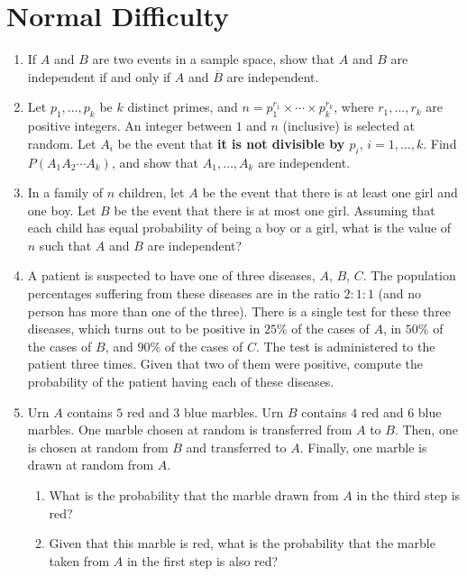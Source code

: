 \documentclass[svgnames]{amsart}
\begin{document}
\section{Normal Difficulty}
\begin{enumerate}[leftmargin=*]
\item If $A$ and $B$ are two events in a sample space, show that $A$ and $B$ are independent if and only if $A$ and $\overline B$ are independent.

\item Let $p_1, \ldots, p_k$ be $k$ distinct primes, and $n = p_1^{r_1} \times \cdots \times p_k^{r_k}$, where $r_1, \ldots, r_k$ are positive integers. An integer between $1$ and $n$ (inclusive) is selected at random. Let $A_i$ be the event that \textbf{it is not divisible by $p_i$}, $i = 1, \ldots, k$. Find $P(A_1 A_2 \cdots A_k)$, and show that $A_1, \ldots, A_k$ are independent.

\item In a family of $n$ children, let $A$ be the event that there is at least one girl and one boy. Let $B$ be the event that there is at most one girl. Assuming that each child has equal probability of being a boy or a girl, what is the value of $n$ such that $A$ and $B$ are independent?

\item A patient is suspected to have one of three diseases, $A$, $B$, $C$. The population percentages suffering from these diseases are in the ratio $2:1:1$ (and no person has more than one of the three). There is a single test for these three diseases, which turns out to be positive in $25\%$ of the cases of $A$, in $50\%$ of the cases of $B$, and $90\%$ of the cases of $C$. The test is administered to the patient three times. Given that two of them were positive, compute the probability of the patient having each of these diseases.

\item Urn $A$ contains $5$ red and $3$ blue marbles. Urn $B$ contains $4$ red and $6$ blue marbles. One marble chosen at random is transferred from $A$ to $B$. Then, one is chosen at random from $B$ and transferred to $A$. Finally, one marble is drawn at random from $A$.
\begin{enumerate}
	\item What is the probability that the marble drawn from $A$ in the third step is red?
	\item Given that this marble is red, what is the probability that the marble taken from $A$ in the first step is also red?
\end{enumerate}
\end{enumerate} %
\end{document}
